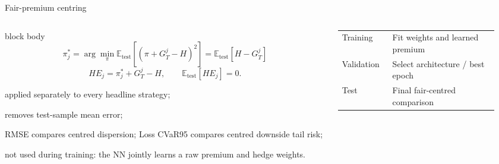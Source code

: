 \begin{frame}[t]{Fair-premium centring}
  \begin{columns}[T,onlytextwidth]
    \begin{column}{0.55\textwidth}
      \begin{beamercolorbox}[rounded=true,sep=0.12cm]{block body}
        {\fontsize{8.1}{9.4}\selectfont\[
          \boxed{\pi_j^*=\arg\min_\pi\mathbb E_{\mathrm{test}}
          \!\left[(\pi+G_T^j-H)^2\right]
          =\mathbb E_{\mathrm{test}}[H-G_T^j]}
        \]}
        \vspace{-0.12cm}
        \[ HE_j=\pi_j^*+G_T^j-H,\qquad \mathbb E_{\mathrm{test}}[HE_j]=0. \]
      \end{beamercolorbox}
      {\scriptsize\begin{tightitemize}
        \item applied separately to every headline strategy;
        \item removes test-sample mean error;
        \item RMSE compares centred dispersion; Loss CVaR95 compares centred downside tail risk;
        \item not used during training: the NN jointly learns a raw premium and hedge weights.
      \end{tightitemize}}
    \end{column}
    \begin{column}{0.41\textwidth}
      {\small
      \begin{tabular}{@{}p{0.27\linewidth}p{0.61\linewidth}@{}}
        \toprule
        Training & Fit weights and learned premium\\
        Validation & Select architecture / best epoch\\
        Test & Final fair-centred comparison\\
        \bottomrule
      \end{tabular}}
      \vspace{0.12cm}
    \end{column}
  \end{columns}
\end{frame}

